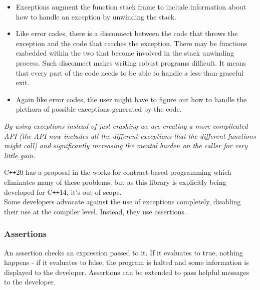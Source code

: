 \documentclass[12pt]{report}
\newcommand{\citenoparen}[1]{\citeauthor{#1} \citeyear{#1}}
\newcommand{\cpp}{C\texttt{++}}
\newcommand{\quotebu}[2]
{
  \begin{displayquote}[\citenoparen{#2}]
    \textit{#1}
  \end{displayquote}
}
\theoremstyle{definition}
\begin{document}
          \begin{itemize}
            \item Exceptions augment the function stack frame to include
              information about how to handle an exception by unwinding the stack.
            \item Like error codes, there is a disconnect between the code
              that throws the exception and the code that catches the exception.
              There may be functions embedded within the two that become
              involved in the stack unwinding process. Such disconnect makes
              writing robust programs difficult. It means that every part of
              the code needs to be able to handle a less-than-graceful exit.
            \item Again like error codes, the user might have to figure out
              how to handle the plethora of possible exceptions generated by
              the code.
          \end{itemize}

          \quotebu{
            By using exceptions instead of just crashing we are creating a more
            complicated API (the API now includes all the different exceptions
            that the different functions might call) and significantly
            increasing the mental burden on the caller for very little gain.
          }{gamasutra}

          \cpp20 has a proposal in the works for contract-based programming
          which eliminates many of these problems, but as this library is
          explicitly being developed for \cpp14, it's out of scope. \\

          Some developers advocate against the use of exceptions completely,
          disabling their use at the compiler level. Instead, they use
          assertions.

        \subsubsection{Assertions}

          An assertion checks an expression passed to it. If it evaluates to
          true, nothing happens - if it evaluates to false, the program is
          halted and some information is displayed to the developer.
          Assertions can be extended to pass helpful messages to the
          developer. \\
\end{document}
